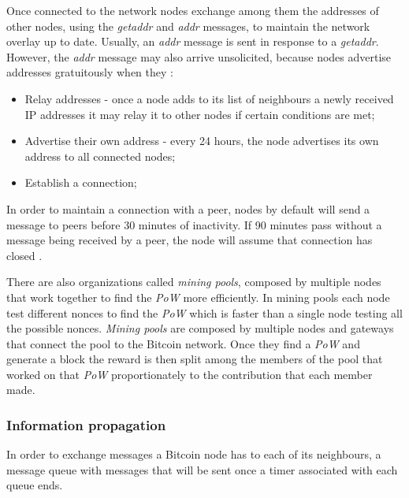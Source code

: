  Once connected to the network nodes exchange among them the addresses of other nodes, using the \textit{getaddr} and \textit{addr} messages, to maintain the network overlay up to date. 
Usually, an \textit{addr} message is sent in response to a \textit{getaddr}. However, the \textit{addr} message may also arrive unsolicited, because nodes advertise addresses gratuitously when they \cite{bitcoinwiki}:
\begin{itemize}
\item Relay addresses - once a node adds to its list of neighbours a newly received IP addresses it may relay it to other nodes if certain conditions are met;
\item Advertise their own address - every 24 hours, the node advertises its own address to all connected nodes;
\item Establish a connection;
\end{itemize}
In order to maintain a connection with a peer, nodes by default will send a message to peers before 30 minutes of inactivity. If 90 minutes pass without a message being received by a peer, the node will assume that connection has closed \cite{bitcoincorewiki}.

There are also organizations called \textit{mining pools}, composed by multiple nodes that work together to find the \textit{PoW} more efficiently. In mining pools each node test different nonces to find the \textit{PoW} which is faster than a single node testing all the possible nonces. \textit{Mining pools} are composed by multiple nodes and gateways that connect the pool to the Bitcoin network. Once they find a \textit{PoW} and generate a block the reward is then split among the members of the pool that worked on that \textit{PoW} proportionately to the contribution that each member made. 
\subsubsection*{Information propagation}
\label{sec:dataexchange}
In order to exchange messages a Bitcoin node has to each of its neighbours, a message queue with messages that will be sent once a timer associated with each queue ends.

